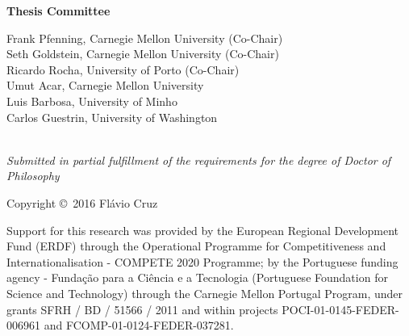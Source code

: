 \begin{center}
\vspace{0.3in}

{\bf Thesis Committee \\}

Frank Pfenning, Carnegie Mellon University (Co-Chair)\\
Seth Goldstein, Carnegie Mellon University (Co-Chair)\\
Ricardo Rocha, University of Porto (Co-Chair)\\
Umut Acar, Carnegie Mellon University\\
Luis Barbosa, University of Minho\\
Carlos Guestrin, University of Washington\\\
\vspace{0.4in}

\emph{Submitted in partial fulfillment of the requirements for the degree of Doctor of Philosophy}

\vfill

Copyright \copyright\ 2016 Fl\'{a}vio Cruz

{\medskip\footnotesize\noindent
Support for this research was provided by the European Regional Development
Fund (ERDF) through the Operational Programme for Competitiveness and
Internationalisation - COMPETE 2020 Programme; by the Portuguese funding agency
- Funda\c{c}\~{a}o para a Ci\^{e}ncia e a
Tecnologia (Portuguese Foundation for Science and Technology) through the
Carnegie Mellon Portugal Program, under grants SFRH / BD / 51566 / 2011 and
within projects POCI-01-0145-FEDER-006961 and FCOMP-01-0124-FEDER-037281.
\par}

\end{center}
